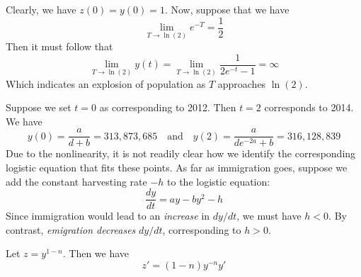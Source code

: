 \documentclass[a4paper]{article}
\begin{document}
Clearly, we have \(z \!\left( 0 \right) = y \!\left( 0 \right) = 1\). Now, suppose that we have
\[
	\lim\limits_{T \to \ln\left( 2 \right)} e^{-T} = \frac{1}{2}
\]
Then it must follow that
\[
	\lim\limits_{T \to \ln\left( 2 \right)}  y \!\left( t \right) = \lim\limits_{T \to \ln\left( 2 \right)} \frac{1}{2e^{-t} - 1} = \infty
\]
Which indicates an explosion of population as \(T\) approaches \(\ln\left( 2 \right)\).

\vspace{12pt}


Suppose we set \(t = 0\) as corresponding to 2012. Then \(t = 2\) corresponds to 2014. We have
\[
	y \!\left( 0 \right) = \frac{a}{d + b} = 313,873,685 \quad \text{and} \quad y \!\left( 2 \right) = \frac{a}{de^{-2a} + b} = 316,128,839
\]
Due to the nonlinearity, it is not readily clear how we identify the corresponding logistic equation that fits these points. As far as immigration goes, suppose we add the constant harvesting rate \(-h\) to the logistic equation:
\[
	\frac{d y}{d t} = ay - by^{2} - h
\]
Since immigration would lead to an \textit{increase} in \(dy/dt\), we must have \(h < 0\). By contrast, \textit{emigration decreases} \(dy/dt\), corresponding to \(h > 0\).

\vspace{12pt}


Let \(z = y^{1-n}\). Then we have
\[
	z' = \!\left( 1-n \right) y^{-n} y'
\]
\end{document}
